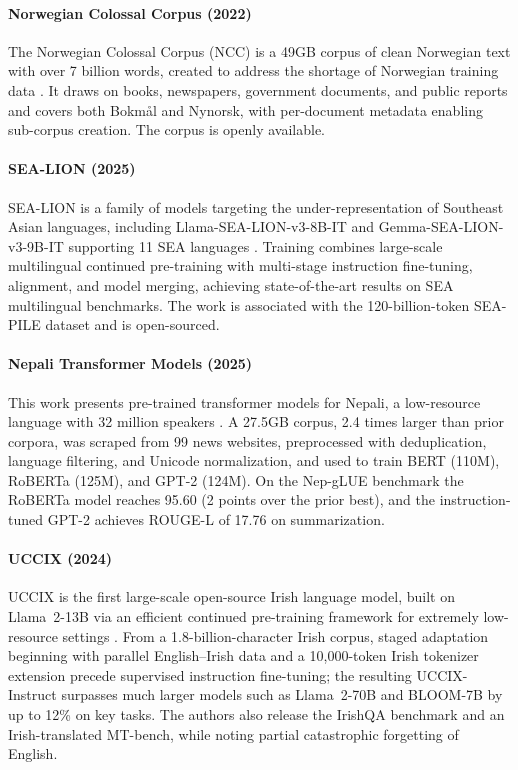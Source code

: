 \documentclass[letterpaper]{article}
\begin{document}
\paragraph{Norwegian Colossal Corpus (2022)} The Norwegian Colossal Corpus (NCC) is a 49GB corpus of clean Norwegian text with over 7 billion words, created to address the shortage of Norwegian training data \citep{kummervold-etal-2022-norwegian}. It draws on books, newspapers, government documents, and public reports and covers both Bokm{\aa}l and Nynorsk, with per-document metadata enabling sub-corpus creation. The corpus is openly available.

\paragraph{SEA-LION (2025)} SEA-LION is a family of models targeting the under-representation of Southeast Asian languages, including Llama-SEA-LION-v3-8B-IT and Gemma-SEA-LION-v3-9B-IT supporting 11 SEA languages \citep{ng2025sealionsoutheastasianlanguages}. Training combines large-scale multilingual continued pre-training with multi-stage instruction fine-tuning, alignment, and model merging, achieving state-of-the-art results on SEA multilingual benchmarks. The work is associated with the 120-billion-token SEA-PILE dataset and is open-sourced.

\paragraph{Nepali Transformer Models (2025)} This work presents pre-trained transformer models for Nepali, a low-resource language with 32 million speakers \citep{thapa2025developmentpretrainedtransformerbasedmodels}. A 27.5GB corpus, 2.4 times larger than prior corpora, was scraped from 99 news websites, preprocessed with deduplication, language filtering, and Unicode normalization, and used to train BERT (110M), RoBERTa (125M), and GPT-2 (124M). On the Nep-gLUE benchmark the RoBERTa model reaches 95.60 (2 points over the prior best), and the instruction-tuned GPT-2 achieves ROUGE-L of 17.76 on summarization.

\paragraph{UCCIX (2024)} UCCIX is the first large-scale open-source Irish language model, built on Llama~2-13B via an efficient continued pre-training framework for extremely low-resource settings \citep{tran2024uccixirishexcellencelargelanguage}. From a 1.8-billion-character Irish corpus, staged adaptation beginning with parallel English--Irish data and a 10,000-token Irish tokenizer extension precede supervised instruction fine-tuning; the resulting UCCIX-Instruct surpasses much larger models such as Llama~2-70B and BLOOM-7B by up to 12\% on key tasks. The authors also release the IrishQA benchmark and an Irish-translated MT-bench, while noting partial catastrophic forgetting of English.
\end{document}

